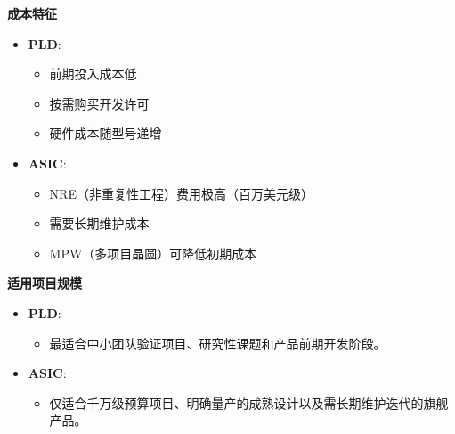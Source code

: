 \documentclass[
  ignorenonframetext,
  chinese,
]{beamer}
\providecommand{\tightlist}{%
  \setlength{\itemsep}{0pt}\setlength{\parskip}{0pt}}
\begin{document}
\begin{frame}
\textbf{成本特征}

\begin{itemize}
\tightlist
\item
  \textbf{PLD}:

  \begin{itemize}
  \tightlist
  \item
    前期投入成本低\\
  \item
    按需购买开发许可\\
  \item
    硬件成本随型号递增\\
  \end{itemize}
\item
  \textbf{ASIC}:

  \begin{itemize}
  \tightlist
  \item
    NRE（非重复性工程）费用极高（百万美元级）\\
  \item
    需要长期维护成本\\
  \item
    MPW（多项目晶圆）可降低初期成本
  \end{itemize}
\end{itemize}
\end{frame}

\begin{frame}
\textbf{适用项目规模}

\begin{itemize}
\tightlist
\item
  \textbf{PLD}:

  \begin{itemize}
  \tightlist
  \item
    最适合中小团队验证项目、研究性课题和产品前期开发阶段。\\
  \end{itemize}
\item
  \textbf{ASIC}:

  \begin{itemize}
  \tightlist
  \item
    仅适合千万级预算项目、明确量产的成熟设计以及需长期维护迭代的旗舰产品。
  \end{itemize}
\end{itemize}
\end{frame}
\end{document}
